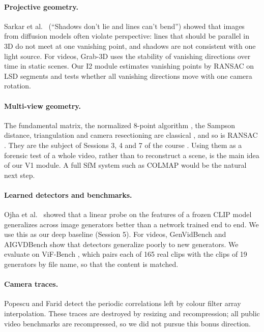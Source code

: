 \documentclass[11pt,a4paper]{article}
\begin{document}
\paragraph{Projective geometry.}
Sarkar et al.\ \cite{sarkar2024} (``Shadows don't lie and lines can't bend'') showed that
images from diffusion models often violate perspective: lines that should be parallel in 3D
do not meet at one vanishing point, and shadows are not consistent with one light source.
For videos, Grab-3D \cite{grab3d} uses the stability of vanishing directions over time in
static scenes. Our I2 module estimates vanishing points by RANSAC on LSD segments
\cite{lsd2010} and tests whether all vanishing directions move with one camera rotation.

\paragraph{Multi-view geometry.}
The fundamental matrix, the normalized 8-point algorithm \cite{hartley1997}, the Sampson
distance, triangulation and camera resectioning are classical
\cite{hartley2004}, and so is RANSAC \cite{fischler1981}. They are the subject of
Sessions 3, 4 and 7 of the course \cite{course}. Using them as a forensic test of a whole
video, rather than to reconstruct a scene, is the main idea of our V1 module. A full SfM
system such as COLMAP \cite{schoenberger2016} would be the natural next step.

\paragraph{Learned detectors and benchmarks.}
Ojha et al.\ \cite{ojha2023} showed that a linear probe on the features of a frozen CLIP
model \cite{radford2021} generalizes across image generators better than a network trained
end to end. We use this as our deep baseline (Session 5). For videos, GenVidBench
\cite{genvidbench} and AIGVDBench \cite{aigvdbench} show that detectors generalize poorly to
new generators. We evaluate on ViF-Bench \cite{vifbench}, which pairs each of 165 real clips
with the clips of 19 generators by file name, so that the content is matched.

\paragraph{Camera traces.}
Popescu and Farid \cite{popescu2005} detect the periodic correlations left by colour filter
array interpolation. These traces are destroyed by resizing and recompression; all public
video benchmarks are recompressed, so we did not pursue this bonus direction.
\end{document}
